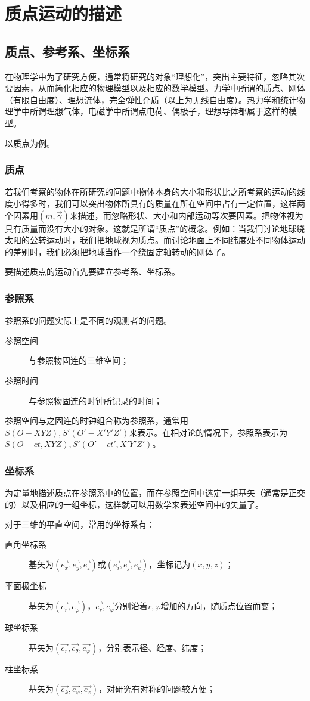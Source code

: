 \section{质点运动的描述}
\subsection{质点、参考系、坐标系}
在物理学中为了研究方便，通常将研究的对象“理想化”，突出主要特征，忽略其次要因素，从而简化相应的物理模型以及相应的数学模型。力学中所谓的质点、刚体（有限自由度）、理想流体，完全弹性介质（以上为无线自由度）。热力学和统计物理学中所谓理想气体，电磁学中所谓点电荷、偶极子，理想导体都属于这样的模型。

以质点为例。

\subsubsection{质点}若我们考察的物体在所研究的问题中物体本身的大小和形状比之所考察的运动的线度小得多时，我们可以突出物体所具有的质量在所在空间中占有一定位置，这样两个因素用$(m,\vec{\gamma})$来描述，而忽略形状、大小和内部运动等次要因素。把物体视为具有质量而没有大小的对象。这就是所谓“质点”的概念。例如：当我们讨论地球绕太阳的公转运动时，我们把地球视为质点。而讨论地面上不同纬度处不同物体运动的差别时，我们必须把地球当作一个绕固定轴转动的刚体了。

要描述质点的运动首先要建立参考系、坐标系。
\subsubsection{参照系}

参照系的问题实际上是不同的观测者的问题。
\begin{description}
\item[参照空间]与参照物固连的三维空间；
\item[参照时间]与参照物固连的时钟所记录的时间；
\end{description}
参照空间与之固连的时钟组合称为参照系，通常用$S(O-XYZ),S'(O'-X'Y'Z')$来表示。在相对论的情况下，参照系表示为$S(O-ct,XYZ),S'(O'-ct',X'Y'Z')$。
\subsubsection{坐标系}
为定量地描述质点在参照系中的位置，而在参照空间中选定一组基矢（通常是正交的）以及相应的一组坐标，这样就可以用数学来表述空间中的矢量了。

对于三维的平直空间，常用的坐标系有：
\begin{description}
\item[直角坐标系]基矢为$(\vec{e_x},\vec{e_y},\vec{e_z})$或$(\vec{e_i},\vec{e_j},\vec{e_k})$，坐标记为$(x,y,z)$；
\item[平面极坐标]基矢为$(\vec{e_r},\vec{e_\varphi})$，$\vec{e_r},\vec{e_\varphi}$分别沿着$r,\varphi$增加的方向，随质点位置而变；
\item[球坐标系]基矢为$(\vec{e_r},\vec{e_\theta},\vec{e_\varphi})$，分别表示径、经度、纬度；
\item[柱坐标系]基矢为$(\vec{e_k},\vec{e_\varphi},\vec{e_z})$，对研究有对称的问题较方便；
\end{description}

